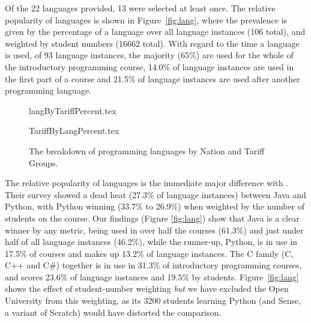 \documentclass{sig-alternate}
\begin{document}
Of the 22 languages provided, 13 were selected at least once. The
relative popularity of languages is shown in Figure~\ref{fig:lang},
where the prevalence is given by the percentage of a language over all
language instances (106 total), and weighted by student numbers (16662
total). With regard to the time a language is used, of 93
language instances, the majority (65\%) are used for the whole of the
introductory programming course, 14.0\% of language instances are used
in the first part of a course and 21.5\% of language instances are
used after another programming language.


\begin{figure}[ht]
\begin{center}
{langByTariffPercent.tex}
\end{center}%
%
\begin{center}
{TariffByLangPercent.tex}
\end{center}\vskip-18pt
\caption{The breakdown of programming languages by Nation and Tariff Groups.\label{fig;LangTariff}}
\end{figure}

The relative popularity of languages is the immediate major difference
with \cite{mason+cooper:2014}. Their survey showed a dead heat (27.3\%
of language instances) between Java and Python, with Python winning
(33.7\% to 26.9\%) when weighted by the number of students on the
course.  Our findings (Figure \ref{fig:lang}) show that Java is a
clear winner by any metric, being used in over half the courses
(61.3\%) and just under half of all language instances (46.2\%), while
the runner-up, Python, is in use in 17.5\% of courses and makes up
13.2\% of language instances. The C family (C, C++ and C\#) together
is in use in 31.3\% of introductory programming courses, and scores
23.6\% of language instances and 19.5\% by
students. Figure~\ref{fig:lang} shows the effect of student-number
weighting \emph{but} we have excluded the Open University from this
weighting, as its 3200 students learning Python (and Sense, a variant
of Scratch) would have distorted the comparison.
\end{document}

